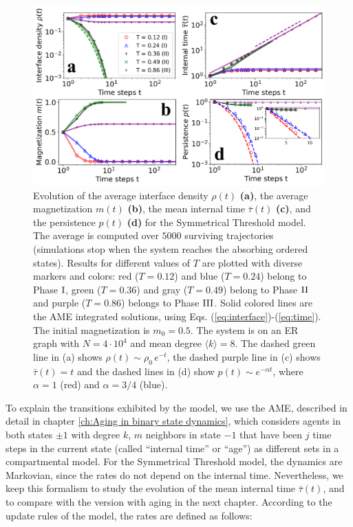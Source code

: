 \begin{figure}[ht]
	\centering \captionsetup{font=sf}
	\includegraphics[width=\textwidth]{Figs/Aging_STM/FIG3.pdf}
	\caption[Symmetrical Threshold model dynamics in random networks]{\label{fig:evolution_random} Evolution of the average interface density $\rho(t)$ \textbf{(a)}, the average magnetization $m(t)$ \textbf{(b)}, the mean internal time $\bar{\tau}(t)$ \textbf{(c)}, and the persistence $p(t)$ \textbf{(d)} for the Symmetrical Threshold model. The average is computed over $5000$ surviving trajectories (simulations stop when the system reaches the absorbing ordered states). Results for different values of $T$ are plotted with diverse markers and colors: red ($T = 0.12$) and blue ($T = 0.24$) belong to Phase ${\rm I}$, green ($T = 0.36$) and gray ($T = 0.49$) belong to Phase ${\rm II}$ and purple ($T = 0.86$) belongs to Phase ${\rm III}$. Solid colored lines are the AME integrated solutions, using Eqs. (\ref{eq:interface})-(\ref{eq:time}). The initial magnetization is $m_0 = 0.5$. The system is on an ER graph with $N = 4 \cdot 10^4$ and mean degree $\langle k \rangle = 8$. The dashed green line in (a) shows $\rho(t) \sim \rho_0 \, e^{-t}$, the dashed purple line in (c) shows $\bar{\tau}(t) = t$ and the dashed lines in (d) show $p(t) \sim e^{-\alpha t}$, where $\alpha = 1$ (red) and $\alpha = 3/4$ (blue). 
	}
\end{figure}
To explain the transitions exhibited by the model, we use the AME, described in detail in chapter \ref{ch:Aging in binary state dynamics}, which considers agents in both states $\pm 1$ with degree $k$, $m$ neighbors in state $-1$ that have been $j$ time steps in the current state (called ``internal time'' or ``age'') as different sets in a compartmental model. For the Symmetrical Threshold model, the dynamics are Markovian, since the rates do not depend on the internal time. Nevertheless, we keep this formalism to study the evolution of the mean internal time $\bar{\tau}(t)$, and to compare with the version with aging in the next chapter. According to the update rules of the model, the rates are defined as follows:
